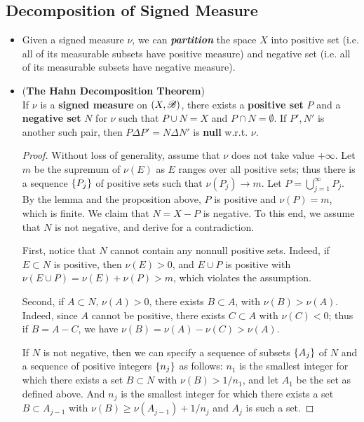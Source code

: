 \documentclass[11pt]{article}
\begin{document}
\subsection{Decomposition of Signed Measure}
\begin{itemize}
\item \begin{remark}
Given a signed measure $\nu$, we can \emph{\textbf{partition}} the space $X$ into positive set (i.e. all of its measurable subsets have positive measure) and negative set (i.e. all of its measurable subsets have negative measure).
\end{remark}

\item \begin{theorem}(\textbf{The Hahn Decomposition Theorem})\citep{folland2013real}\\
If $\nu$ is a \textbf{signed measure} on $(X,{\mathscr B})$, there exists a \textbf{positive set} $P$ and a \textbf{negative set} $N$ for $\nu$ such that $P\cup N= X$ and $P\cap N=\emptyset$. If $P', N'$ is another such pair, then $P\Delta P'= N\Delta N'$ is \textbf{null} w.r.t. $\nu$.
\end{theorem}
\begin{proof}
Without loss of generality, assume that $\nu$ does not take value $+\infty$. Let $m$ be the supremum of $\nu(E)$ as $E$ ranges over all positive sets; thus there is a sequence $\left\{P_{j}\right\}$ of positive sets such that $\nu(P_{j})\rightarrow m$. Let $P= \bigcup_{j=1}^{\infty}P_{j}$. By the lemma and the proposition above, $P$ is positive and $\nu(P)= m$, which is finite. We claim that $N= X-P$ is negative. To this end, we assume that $N$ is not negative, and derive for a contradiction.

First, notice that $N$ cannot contain any nonnull positive sets. Indeed, if $E\subset N$ is positive, then $\nu(E)>0$, and $E\cup P$ is positive with $\nu(E\cup P) = \nu(E)+ \nu(P)> m$, which violates the assumption.

Second, if $A\subset N$, $\nu(A)>0$, there exists $B\subset A$, with $\nu(B)> \nu(A)$. Indeed,  since $A$ cannot be positive, there exists $C\subset A$ with $\nu(C)<0$; thus if $B= A-C$, we have $\nu(B)= \nu(A)- \nu(C) > \nu(A)$.

If $N$ is not negative, then we can specify a sequence of subsets $\left\{A_{j}\right\}$ of $N$ and a sequence of positive integers $\left\{n_{j}\right\}$ as follows:  $n_{1}$ is the smallest integer for which there exists a set $B\subset N$ with $\nu(B)> 1/n_{1}$, and let $A_{1}$ be the set as defined above. And $n_j$ is the smallest integer for which there exists a set $B\subset A_{j-1}$ with $\nu(B)\ge \nu(A_{j-1})+ 1/n_{j}$ and $A_{j}$ is such a set. 


\end{proof}
\end{itemize}
\end{document}
